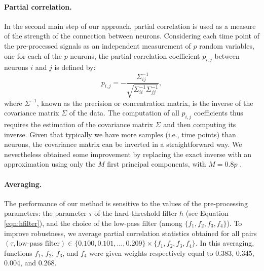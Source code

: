 \documentclass[wcp]{jmlr}
\begin{document}
\paragraph{Partial correlation.}
In the second main step of our approach, partial correlation is used as a
measure of the strength of the connection between neurons. Considering each
time point of the pre-processed signals as an independent measurement
of $p$ random variables, one for each of the $p$ neurons,
the partial correlation coefficient $p_{i,j}$ between neurons $i$ and $j$ is
defined by:
\begin{equation}
p_{i,j} =
-\frac{\Sigma^{-1}_{ij}}{\sqrt{\Sigma^{-1}_{ii} \Sigma^{-1}_{jj}}}, \label{eq:inverse}
\end{equation}
where $\Sigma^{-1}$, known as the precision or concentration matrix, is the
inverse of the covariance matrix $\Sigma$ of the data. The computation of all
$p_{i,j}$ coefficients thus requires the estimation of the covariance matrix
$\Sigma$ and then computing its inverse. Given that typically we have more
samples (i.e., time points) than neurons, the covariance matrix can be inverted
in a straightforward way. We nevertheless obtained some improvement by
replacing the exact inverse with an approximation using only the $M$ first
principal components, with $M=0.8p$ \citep{bishop2006pattern}.

\paragraph{Averaging.}
The performance of our method is sensitive to the values of the pre-processing
parameters: the parameter $\tau$ of the hard-threshold filter $h$ (see Equation
\ref{eqn:hfilter}), and the choice of the low-pass filter (among $\{f_1,
f_2, f_3, f_4\}$). To improve robustness, we average partial correlation
statistics obtained for all pairs $(\tau,\mbox{low-pass filter}) \in
\{0.100,0.101,\ldots,0.209\}\times \{f_1, f_2, f_3, f_4\}$. In this averaging,
functions $f_1$, $f_2$, $f_3$, and $f_4$ were given weights respectively equal
to $0.383$, $0.345$, $0.004$, and $0.268$.
\end{document}
